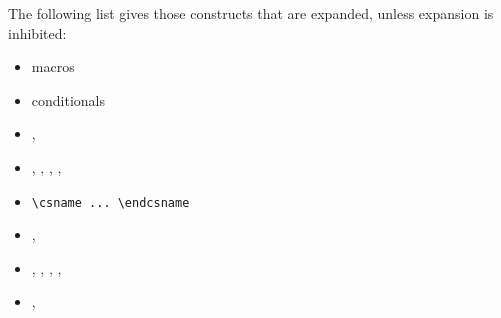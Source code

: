 \documentclass[letterpaper]{book}
\begin{document}
The following list gives those constructs
that are expanded, unless
expansion is inhibited:
\begin{itemize}
\item macros\label{expand:lijst}
\item conditionals
\item {}, 
\item {}, , , 
      , 
\item \verb,\csname ... \endcsname,
\item {}, 
\item {}, , , 
      , 
\item {}, 
\end{itemize}
\end{document}
